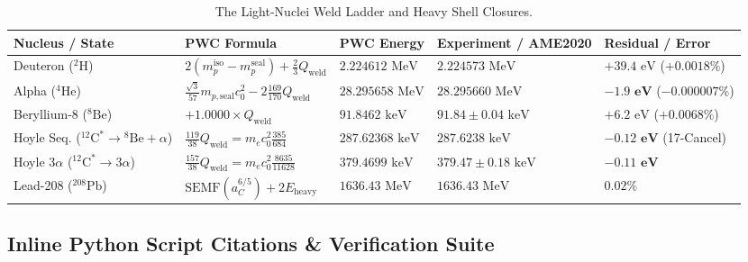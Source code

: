 \documentclass[11pt,a4paper]{article}
\begin{document}
\begin{table}[!htbp]
\centering
\caption{The Light-Nuclei Weld Ladder and Heavy Shell Closures.}
\label{tab:weld_ladder}
\footnotesize
\setlength{\tabcolsep}{4pt}
\renewcommand{\arraystretch}{1.22}
\begin{tabularx}{\textwidth}{L{2.7cm} Y L{2.3cm} L{2.6cm} L{2.5cm}}
\toprule
\textbf{Nucleus / State} & \textbf{PWC Formula} & \textbf{PWC Energy} & \textbf{Experiment / AME2020} & \textbf{Residual / Error} \\
\midrule
Deuteron ($^2\text{H}$) & $2(m_p^{\text{iso}} - m_p^{\text{seal}}) + \frac{2}{3}Q_{\text{weld}}$ & $2.224612\text{ MeV}$ & $2.224573\text{ MeV}$ & $+39.4\text{ eV}$ ($+0.0018\%$) \\
Alpha ($^4\text{He}$) & $\frac{\sqrt{3}}{57}m_{p,\text{seal}}c_0^2 - 2\frac{169}{170}Q_{\text{weld}}$ & $28.295658\text{ MeV}$ & $28.295660\text{ MeV}$ & $\mathbf{-1.9\text{ eV}}$ ($-0.000007\%$) \\
Beryllium-8 ($^8\text{Be}$) & $+1.0000 \times Q_{\text{weld}}$ & $91.8462\text{ keV}$ & $91.84 \pm 0.04\text{ keV}$ & $+6.2\text{ eV}$ ($+0.0068\%$) \\
Hoyle Seq. ($^{12}\text{C}^* \to {}^8\text{Be} + \alpha$) & $\frac{119}{38}Q_{\text{weld}} = m_e c_0^2 \frac{385}{684}$ & $287.62368\text{ keV}$ & $287.6238\text{ keV}$ & $\mathbf{-0.12\text{ eV}}$ (17-Cancel) \\
Hoyle $3\alpha$ ($^{12}\text{C}^* \to 3\alpha$) & $\frac{157}{38}Q_{\text{weld}} = m_e c_0^2 \frac{8635}{11628}$ & $379.4699\text{ keV}$ & $379.47 \pm 0.18\text{ keV}$ & $\mathbf{-0.11\text{ eV}}$ \\
Lead-208 ($^{208}\text{Pb}$) & $\text{SEMF}(a_C^{6/5}) + 2E_{\text{heavy}}$ & $1636.43\text{ MeV}$ & $1636.43\text{ MeV}$ & $0.02\%$ \\
\bottomrule
\end{tabularx}
\end{table}

\subsection{Inline Python Script Citations \& Verification Suite}
\label{subsec:script_citations}
\end{document}

